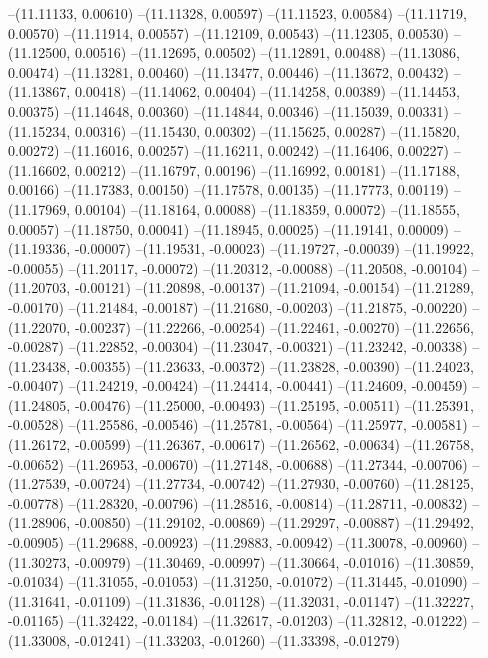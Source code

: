 --(11.11133, 0.00610)
--(11.11328, 0.00597)
--(11.11523, 0.00584)
--(11.11719, 0.00570)
--(11.11914, 0.00557)
--(11.12109, 0.00543)
--(11.12305, 0.00530)
--(11.12500, 0.00516)
--(11.12695, 0.00502)
--(11.12891, 0.00488)
--(11.13086, 0.00474)
--(11.13281, 0.00460)
--(11.13477, 0.00446)
--(11.13672, 0.00432)
--(11.13867, 0.00418)
--(11.14062, 0.00404)
--(11.14258, 0.00389)
--(11.14453, 0.00375)
--(11.14648, 0.00360)
--(11.14844, 0.00346)
--(11.15039, 0.00331)
--(11.15234, 0.00316)
--(11.15430, 0.00302)
--(11.15625, 0.00287)
--(11.15820, 0.00272)
--(11.16016, 0.00257)
--(11.16211, 0.00242)
--(11.16406, 0.00227)
--(11.16602, 0.00212)
--(11.16797, 0.00196)
--(11.16992, 0.00181)
--(11.17188, 0.00166)
--(11.17383, 0.00150)
--(11.17578, 0.00135)
--(11.17773, 0.00119)
--(11.17969, 0.00104)
--(11.18164, 0.00088)
--(11.18359, 0.00072)
--(11.18555, 0.00057)
--(11.18750, 0.00041)
--(11.18945, 0.00025)
--(11.19141, 0.00009)
--(11.19336, -0.00007)
--(11.19531, -0.00023)
--(11.19727, -0.00039)
--(11.19922, -0.00055)
--(11.20117, -0.00072)
--(11.20312, -0.00088)
--(11.20508, -0.00104)
--(11.20703, -0.00121)
--(11.20898, -0.00137)
--(11.21094, -0.00154)
--(11.21289, -0.00170)
--(11.21484, -0.00187)
--(11.21680, -0.00203)
--(11.21875, -0.00220)
--(11.22070, -0.00237)
--(11.22266, -0.00254)
--(11.22461, -0.00270)
--(11.22656, -0.00287)
--(11.22852, -0.00304)
--(11.23047, -0.00321)
--(11.23242, -0.00338)
--(11.23438, -0.00355)
--(11.23633, -0.00372)
--(11.23828, -0.00390)
--(11.24023, -0.00407)
--(11.24219, -0.00424)
--(11.24414, -0.00441)
--(11.24609, -0.00459)
--(11.24805, -0.00476)
--(11.25000, -0.00493)
--(11.25195, -0.00511)
--(11.25391, -0.00528)
--(11.25586, -0.00546)
--(11.25781, -0.00564)
--(11.25977, -0.00581)
--(11.26172, -0.00599)
--(11.26367, -0.00617)
--(11.26562, -0.00634)
--(11.26758, -0.00652)
--(11.26953, -0.00670)
--(11.27148, -0.00688)
--(11.27344, -0.00706)
--(11.27539, -0.00724)
--(11.27734, -0.00742)
--(11.27930, -0.00760)
--(11.28125, -0.00778)
--(11.28320, -0.00796)
--(11.28516, -0.00814)
--(11.28711, -0.00832)
--(11.28906, -0.00850)
--(11.29102, -0.00869)
--(11.29297, -0.00887)
--(11.29492, -0.00905)
--(11.29688, -0.00923)
--(11.29883, -0.00942)
--(11.30078, -0.00960)
--(11.30273, -0.00979)
--(11.30469, -0.00997)
--(11.30664, -0.01016)
--(11.30859, -0.01034)
--(11.31055, -0.01053)
--(11.31250, -0.01072)
--(11.31445, -0.01090)
--(11.31641, -0.01109)
--(11.31836, -0.01128)
--(11.32031, -0.01147)
--(11.32227, -0.01165)
--(11.32422, -0.01184)
--(11.32617, -0.01203)
--(11.32812, -0.01222)
--(11.33008, -0.01241)
--(11.33203, -0.01260)
--(11.33398, -0.01279)

